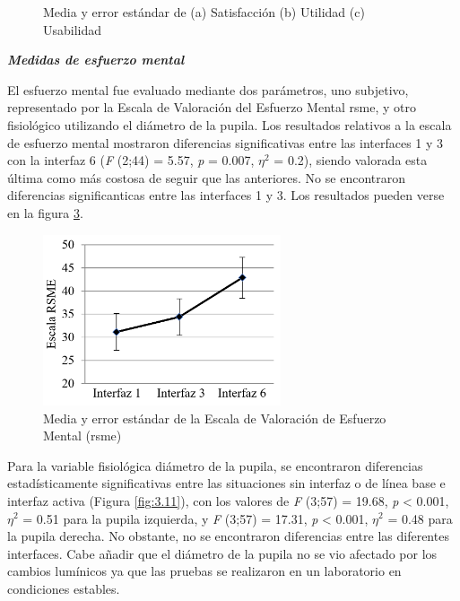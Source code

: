 \begin{figure}[h]
\begin{subfigure}[b]{0.45\textwidth}
    \caption{}
    \label{fig:3.9c}
  \end{subfigure}
  \caption{Media y error estándar de (a) Satisfacción (b) Utilidad (c) Usabilidad}
  \label{fig:3.9}
\end{figure}

\textbf{\emph{Medidas de esfuerzo mental}}

El esfuerzo mental fue evaluado mediante dos parámetros, uno subjetivo, representado por la Escala de Valoración del Esfuerzo Mental \gls{rsme}, y otro fisiológico utilizando el diámetro de la pupila. Los resultados relativos a la escala de esfuerzo mental mostraron diferencias significativas entre las interfaces 1 y 3 con la interfaz 6 (\emph{F} (2;44) = 5.57, \emph{p} = 0.007, $\eta^2$ = 0.2), siendo valorada esta última como más costosa de seguir que las anteriores. No se encontraron diferencias significanticas entre las interfaces 1 y 3. Los resultados pueden verse en la figura \ref{fig:3.10}.

\newpage
\begin{figure}[h]
    \centering
    \includegraphics[width=7cm]
    {figures/3.10.png}
    \caption{ \label{fig:3.10} Media y error estándar de la Escala de Valoración de Esfuerzo Mental (\gls{rsme})}
\end{figure}

Para la variable fisiológica diámetro de la pupila, se encontraron diferencias estadísticamente significativas entre las situaciones sin interfaz o de línea base e interfaz activa (Figura \ref{fig:3.11}), con los valores de \emph{F} (3;57) = 19.68, \emph{p} < 0.001, $\eta^2$ = 0.51 para la pupila izquierda, y \emph{F} (3;57) = 17.31, \emph{p} < 0.001, $\eta^2$ = 0.48 para la pupila derecha. No obstante, no se encontraron diferencias entre las diferentes interfaces. Cabe añadir que el diámetro de la pupila no se vio afectado por los cambios lumínicos ya que las pruebas se realizaron en un laboratorio en condiciones estables. 


